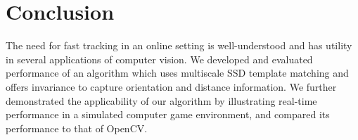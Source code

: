 \documentclass[10pt,twocolumn,letterpaper]{article}
\begin{document}
\section{Conclusion}
The need for fast tracking in an online setting is well-understood and has utility
in several applications of computer vision. We developed and evaluated performance
of an algorithm which uses multiscale SSD template matching and offers invariance to
capture orientation and distance information. We further demonstrated the applicability of our
algorithm by illustrating real-time performance in a simulated computer game environment,
and compared its performance to that of OpenCV.

{\small


}
\end{document}
